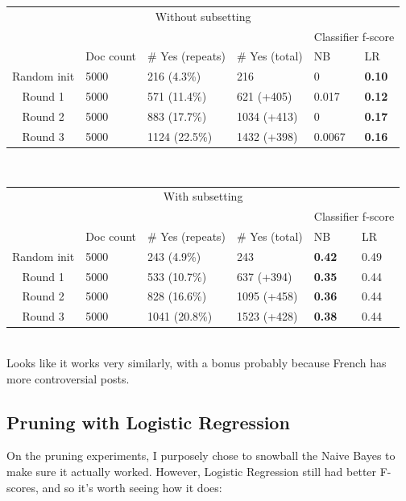 \documentclass[11pt]{article} %
\begin{document}
\begin{tabular}{|c|l|l|l|l|l|}
\multicolumn{6}{|c|}{Without subsetting} \\
\rowcolor{gray!50} &&&& \multicolumn{2}{|c|}{Classifier f-score} \\
\rowcolor{gray!50} & Doc count & \# Yes (repeats) & \# Yes (total) & NB & LR \\
Random init & 5000 & 216 (4.3\%) & 216 & 0 & \textbf{0.10} \\
Round 1 & 5000 &  571 (11.4\%) & 621 (+405)& 0.017 & \textbf{0.12} \\
Round 2 & 5000 & 883 (17.7\%) & 1034 (+413)& 0 & \textbf{0.17} \\
Round 3 & 5000 & 1124 (22.5\%) & 1432 (+398) & 0.0067 & \textbf{0.16} \\
\end{tabular}
\\
\begin{tabular}{|c|l|l|l|l|l|}
\multicolumn{6}{|c|}{With subsetting} \\
\rowcolor{gray!50} &&&& \multicolumn{2}{|c|}{Classifier f-score} \\
\rowcolor{gray!50} & Doc count & \# Yes (repeats) & \# Yes (total) & NB & LR \\
Random init & 5000 & 243 (4.9\%) & 243 & \textbf{0.42} & 0.49 \\
Round 1 & 5000 & 533 (10.7\%) & 637 (+394)& \textbf{0.35} & 0.44 \\
Round 2 & 5000 & 828 (16.6\%) & 1095 (+458)& \textbf{0.36} & 0.44 \\
Round 3 & 5000 & 1041 (20.8\%) & 1523 (+428)& \textbf{0.38} & 0.44 \\
\end{tabular}\\

Looks like it works very similarly, with a bonus probably because French has more controversial posts.

\subsection{Pruning with Logistic Regression}

On the pruning experiments, I purposely chose to snowball the Naive Bayes to make sure it actually worked. However, Logistic Regression still had better F-scores, and so it's worth seeing how it does: \\
\end{document}
